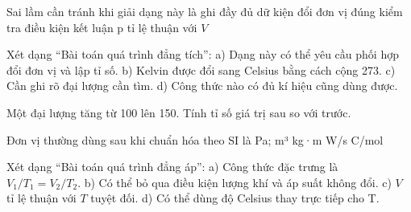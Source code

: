 \begin{ex}
Sai lầm cần tránh khi giải dạng này là
\choice
{ghi đầy đủ dữ kiện}
{đổi đơn vị đúng}
{kiểm tra điều kiện}
{\True kết luận p tỉ lệ thuận với $V$}
\end{ex}

\begin{ex}
Xét dạng “Bài toán quá trình đẳng tích”: a) Dạng này có thể yêu cầu phối hợp đổi đơn vị và lập tỉ số. b) Kelvin được đổi sang Celsius bằng cách cộng 273. c) Cần ghi rõ đại lượng cần tìm. d) Công thức nào có đủ kí hiệu cũng dùng được.
\choiceTF

\end{ex}

\begin{ex}
Một đại lượng tăng từ 100 lên 150. Tính tỉ số giá trị sau so với trước.
\end{ex}

\begin{ex}
Đơn vị thường dùng sau khi chuẩn hóa theo SI là
\choice
{\True Pa; m³}
{kg·m}
{W/s}
{C/mol}
\end{ex}

\begin{ex}
Xét dạng “Bài toán quá trình đẳng áp”: a) Công thức đặc trưng là $V_1/T_1=V_2/T_2$. b) Có thể bỏ qua điều kiện lượng khí và áp suất không đổi. c) $V$ tỉ lệ thuận với $T$ tuyệt đối. d) Có thể dùng độ Celsius thay trực tiếp cho T.
\choiceTF

\end{ex}

